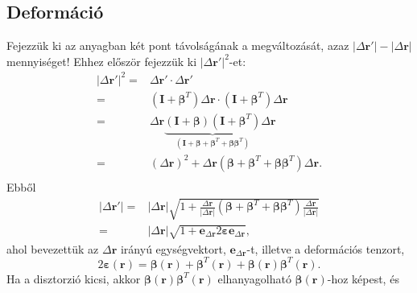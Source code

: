 \documentclass[12pt,a4paper]{scrartcl}
\let\mathbf\bm
\begin{document}
\subsection{Deformáció}
Fejezzük ki az anyagban két pont távolságának a megváltozását, azaz $\left| {\Delta {\mathbf{r}}'} \right| - \left| {\Delta {\mathbf{r}}} \right|$ mennyiséget! Ehhez először fejezzük ki ${\left| {\Delta {\mathbf{r}}'} \right|^2}$-et:
\[\begin{aligned}
  {\left| {\Delta {\mathbf{r}}'} \right|^2} =  & \Delta {\mathbf{r}}' \cdot \Delta {\mathbf{r}}' \\ 
   =  & \left( {{\mathbf{I}} + {{\mathbf{\beta }}^T}} \right)\Delta {\mathbf{r}} \cdot \left( {{\mathbf{I}} + {{\mathbf{\beta }}^T}} \right)\Delta {\mathbf{r}} \\ 
   =  & \Delta {\mathbf{r}}\underbrace {\left( {{\mathbf{I}} + {\mathbf{\beta }}} \right)\left( {{\mathbf{I}} + {{\mathbf{\beta }}^T}} \right)}_{\left( {{\mathbf{I}} + {\mathbf{\beta }} + {{\mathbf{\beta }}^T} + {\mathbf{\beta }}{{\mathbf{\beta }}^T}} \right)}\Delta {\mathbf{r}} \\ 
   =  & {\left( {\Delta {\mathbf{r}}} \right)^2} + \Delta {\mathbf{r}}\left( {{\mathbf{\beta }} + {{\mathbf{\beta }}^T} + {\mathbf{\beta }}{{\mathbf{\beta }}^T}} \right)\Delta {\mathbf{r}} .\\ 
\end{aligned} \]
Ebből
\begin{align} \label{eq:deform_def}
  \left| {\Delta {\mathbf{r}}'} \right| =  & \left| {\Delta {\mathbf{r}}} \right|\sqrt {1 + \frac{{\Delta {\mathbf{r}}}}{{\left| {\Delta {\mathbf{r}}} \right|}}\left( {{\mathbf{\beta }} + {{\mathbf{\beta }}^T} + {\mathbf{\beta }}{{\mathbf{\beta }}^T}} \right)\frac{{\Delta {\mathbf{r}}}}{{\left| {\Delta {\mathbf{r}}} \right|}}}  \nonumber \\ 
   =  & \left| {\Delta {\mathbf{r}}} \right|\sqrt {1 + {{\mathbf{e}}_{\Delta {\mathbf{r}}}}2{\mathbf{\varepsilon }}{{\mathbf{e}}_{\Delta {\mathbf{r}}}}},
\end{align}
ahol bevezettük az ${\Delta {\mathbf{r}}}$ irányú egységvektort, ${{\mathbf{e}}_{\Delta {\mathbf{r}}}}$-t, illetve a deformációs tenzort,
\[2{\mathbf{\varepsilon }}\left( {\mathbf{r}} \right) = {\mathbf{\beta }}\left( {\mathbf{r}} \right) + {{\mathbf{\beta }}^T}\left( {\mathbf{r}} \right) + {\mathbf{\beta }}\left( {\mathbf{r}} \right){{\mathbf{\beta }}^T}\left( {\mathbf{r}} \right).\]
Ha a disztorzió kicsi, akkor ${\mathbf{\beta }}\left( {\mathbf{r}} \right){{\mathbf{\beta }}^T}\left( {\mathbf{r}} \right)$ elhanyagolható ${\mathbf{\beta }}\left( {\mathbf{r}} \right)$-hoz képest, és 
\end{document}
